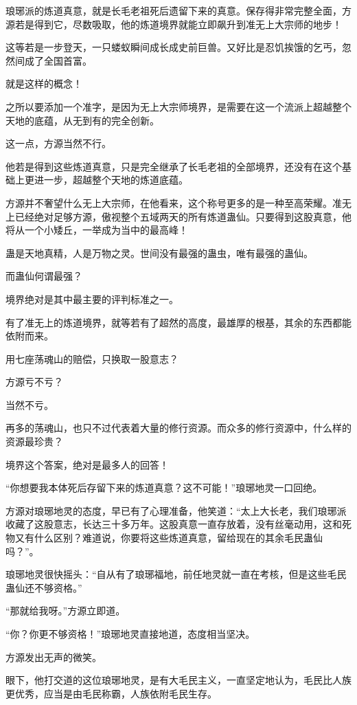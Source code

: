 \begin{this_body}
琅琊派的炼道真意，就是长毛老祖死后遗留下来的真意。保存得非常完整全面，方源若是得到它，尽数吸取，他的炼道境界就能立即飙升到准无上大宗师的地步！

这等若是一步登天，一只蝼蚁瞬间成长成史前巨兽。又好比是忍饥挨饿的乞丐，忽然间成了全国首富。

就是这样的概念！

之所以要添加一个准字，是因为无上大宗师境界，是需要在这一个流派上超越整个天地的底蕴，从无到有的完全创新。

这一点，方源当然不行。

他若是得到这些炼道真意，只是完全继承了长毛老祖的全部境界，还没有在这个基础上更进一步，超越整个天地的炼道底蕴。

方源并不奢望什么无上大宗师，在他看来，这个称号更多的是一种至高荣耀。准无上已经绝对足够方源，傲视整个五域两天的所有炼道蛊仙。只要得到这股真意，他将从一个小矮丘，一举成为当中的最高峰！

蛊是天地真精，人是万物之灵。世间没有最强的蛊虫，唯有最强的蛊仙。

而蛊仙何谓最强？

境界绝对是其中最主要的评判标准之一。

有了准无上的炼道境界，就等若有了超然的高度，最雄厚的根基，其余的东西都能依附而来。

用七座荡魂山的赔偿，只换取一股意志？

方源亏不亏？

当然不亏。

再多的荡魂山，也只不过代表着大量的修行资源。而众多的修行资源中，什么样的资源最珍贵？

境界这个答案，绝对是最多人的回答！

“你想要我本体死后存留下来的炼道真意？这不可能！”琅琊地灵一口回绝。

方源对琅琊地灵的态度，早已有了心理准备，他笑道：“太上大长老，我们琅琊派收藏了这股意志，长达三十多万年。这股真意一直存放着，没有丝毫动用，这和死物又有什么区别？难道说，你要将这些炼道真意，留给现在的其余毛民蛊仙吗？”。

琅琊地灵很快摇头：“自从有了琅琊福地，前任地灵就一直在考核，但是这些毛民蛊仙还不够资格。”

“那就给我呀。”方源立即道。

“你？你更不够资格！”琅琊地灵直接地道，态度相当坚决。

方源发出无声的微笑。

眼下，他打交道的这位琅琊地灵，是有大毛民主义，一直坚定地认为，毛民比人族更优秀，应当是由毛民称霸，人族依附毛民生存。


\end{this_body}
